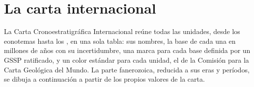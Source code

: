\section{La carta internacional}\label{sec:b1:stratigraphic-scale:chart}

La Carta Cronoestratigráfica Internacional reúne todas las unidades, desde los eonotemas hasta los , en una sola tabla: sus nombres, la base de cada una en millones de años con su incertidumbre, una marca para cada base definida por un GSSP ratificado, y un color estándar para cada unidad, el de la Comisión para la Carta Geológica del Mundo. La parte fanerozoica, reducida a sus eras y períodos, se dibuja a continuación a partir de los propios valores de la carta.

